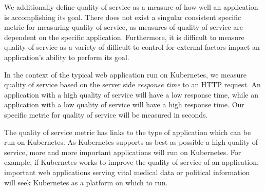 We additionally define quality of service as a measure of how well an application
is accomplishing its goal. There does not exist a singular consistent specific
metric for measuring quality of service, as measures of quality of service are dependent on
the specific application. Furthermore, it is difficult to measure quality of
service as a variety of difficult to control for external factors impact an
application's ability to perform its goal.

In the context of the typical web application run on Kubernetes, we measure
quality of service based on the server side
\textit{response time} to an HTTP request. An application
with a high quality of service will have a low response time, while an
application with a low quality of service will have a high response time. Our
specific metric for quality of service will be measured in seconds.

The quality of service metric has links to the type of application which can be
run on Kubernetes. As Kubernetes supports as best as possible a high quality of
service, more and more important applications will run on Kubernetes. For
example, if Kubernetes works to improve the quality of service of an
application, important web applications serving vital medical data or political
information will seek Kubernetes as a platform on which to run.
